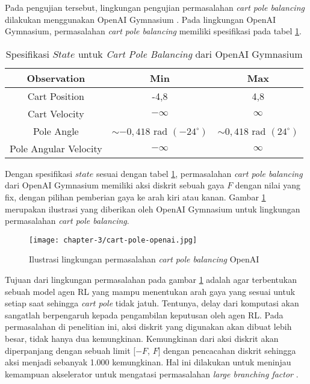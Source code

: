 Pada pengujian tersebut, lingkungan pengujian permasalahan \textit{cart pole balancing} dilakukan menggunakan OpenAI Gymnasium \parencite{towers2023gymnasium}. Pada lingkungan OpenAI Gymnasium, permasalahan \textit{cart pole balancing} memiliki spesifikasi pada tabel \ref{tab:state-space-cart-pole}.

\begin{table}[h!]
	\caption{Spesifikasi $State$ untuk \textit{Cart Pole Balancing} dari OpenAI Gymnasium}
	\label{tab:state-space-cart-pole}
	\centering
	\begin{tabular}{|c|c|c|}
		\hline
		Observation           & Min                             & Max                           \\
		\hline
		Cart Position         & -4,8                            & 4,8                           \\
		\hline
		Cart Velocity         & $-\infty$                       & $\infty$                      \\
		\hline
		Pole Angle            & $\sim -0,418$ rad $(-24^\circ)$ & $\sim 0,418$ rad $(24^\circ)$ \\
		\hline
		Pole Angular Velocity & $-\infty$                       & $\infty$                      \\
		\hline
	\end{tabular}
\end{table}

Dengan spesifikasi $state$ sesuai dengan tabel \ref{tab:state-space-cart-pole}, permasalahan \textit{cart pole balancing} dari OpenAI Gymnasium memiliki aksi diskrit sebuah gaya $F$ dengan nilai yang fix, dengan pilihan pemberian gaya ke arah kiri atau kanan. Gambar \ref{fig:cartpole-openai} merupakan ilustrasi yang diberikan oleh OpenAI Gymnasium untuk lingkungan permasalahan \textit{cart pole balancing}.

\begin{figure}[h]
	\centering
	\texttt{[image: chapter-3/cart-pole-openai.jpg]}
	\caption{Ilustrasi lingkungan permasalahan \textit{cart pole balancing} OpenAI}
	\label{fig:cartpole-openai}
\end{figure}

Tujuan dari lingkungan permasalahan pada gambar \ref{fig:cartpole-openai} adalah agar terbentukan sebuah model agen \ac{RL} yang mampu menentukan arah gaya yang sesuai untuk setiap saat sehingga \textit{cart pole} tidak jatuh. Tentunya, delay dari komputasi akan sangatlah berpengaruh kepada pengambilan keputusan oleh agen \ac{RL}. Pada permasalahan di penelitian ini, aksi diskrit yang digunakan akan dibuat lebih besar, tidak hanya dua kemungkinan. Kemungkinan dari aksi diskrit akan diperpanjang dengan sebuah limit [$-F$, $F$] dengan pencacahan diskrit sehingga aksi menjadi sebanyak 1.000 kemungkinan. Hal ini dilakukan untuk meninjau kemampuan akselerator untuk mengatasi permasalahan \textit{large branching factor} \parencite{amado2018qtable}.

